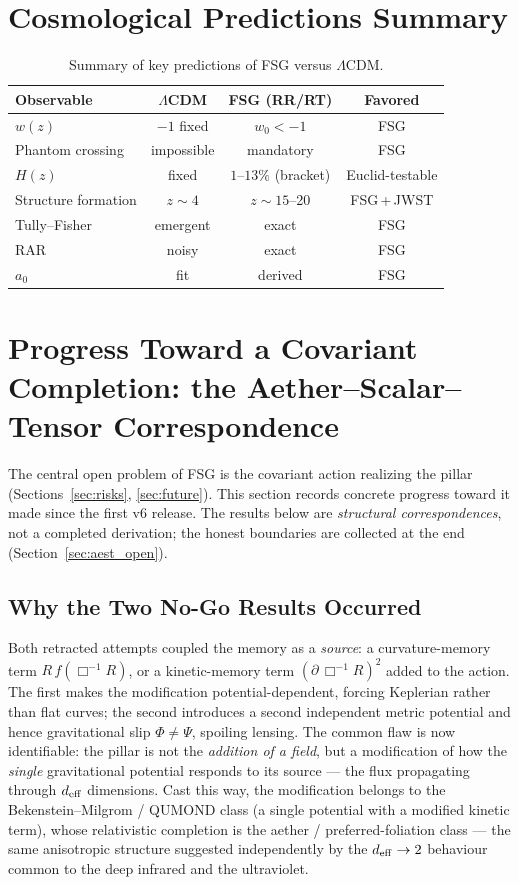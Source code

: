 \documentclass[11pt,a4paper]{article}
\begin{document}
\begin{onehalfspacing}
\section{Cosmological Predictions Summary}
\begin{table}[h!]
\centering
\begin{tabular}{lccc}
\hline
Observable & $\Lambda$CDM & FSG (RR/RT) & Favored \\
\hline
$w(z)$ & $-1$ fixed & $w_0<-1$ & FSG \\
Phantom crossing & impossible & mandatory & FSG \\
$H(z)$ & fixed & $1$--$13\%$ (bracket) & Euclid-testable \\
Structure formation & $z\sim4$ & $z\sim15$--20 & FSG\,+\,JWST \\
Tully--Fisher & emergent & exact & FSG \\
RAR & noisy & exact & FSG \\
$a_0$ & fit & derived & FSG \\
\hline
\end{tabular}
\caption{
Summary of key predictions of FSG versus $\Lambda$CDM.}
\label{table:summary}
\end{table}
\newpage
\section{Progress Toward a Covariant Completion: the Aether--Scalar--Tensor Correspondence}
\label{sec:aest}
The central open problem of FSG is the covariant action realizing the pillar (Sections~\ref{sec:risks}, \ref{sec:future}). This section records concrete progress toward it made since the first v6 release. The results below are \emph{structural correspondences}, not a completed derivation; the honest boundaries are collected at the end (Section~\ref{sec:aest_open}).

\subsection{Why the Two No-Go Results Occurred}
Both retracted attempts coupled the memory as a \emph{source}: a curvature-memory term $R\,f(\Box^{-1}R)$, or a kinetic-memory term $(\partial\,\Box^{-1}R)^2$ added to the action. The first makes the modification potential-dependent, forcing Keplerian rather than flat curves; the second introduces a second independent metric potential and hence gravitational slip $\Phi\neq\Psi$, spoiling lensing. The common flaw is now identifiable: the pillar is not the \emph{addition of a field}, but a modification of how the \emph{single} gravitational potential responds to its source --- the flux propagating through $d_{\rm eff}$ dimensions. Cast this way, the modification belongs to the Bekenstein--Milgrom / QUMOND class (a single potential with a modified kinetic term), whose relativistic completion is the aether / preferred-foliation class --- the same anisotropic structure suggested independently by the $d_{\rm eff}\to2$ behaviour common to the deep infrared and the ultraviolet.


\end{onehalfspacing}
\end{document}
